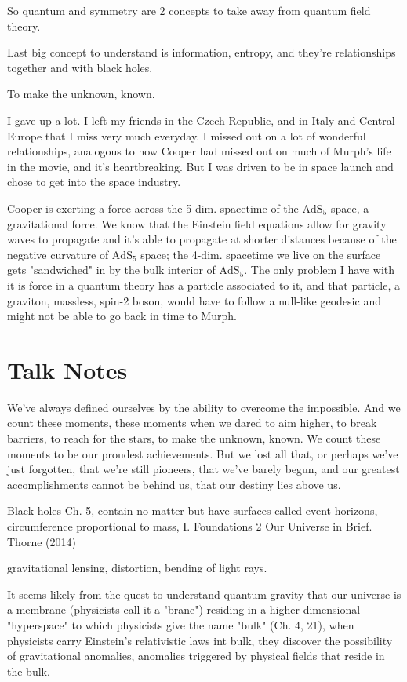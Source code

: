 \documentclass[10pt]{amsart}
\begin{document}
So quantum and symmetry are 2 concepts to take away from quantum field theory.

Last big concept to understand is information, entropy, and they're relationships together and with black holes.



To make the unknown, known.

I gave up a lot. I left my friends in the Czech Republic, and in Italy and Central Europe that I miss very much everyday. I missed out on a lot of wonderful relationships, analogous to how Cooper had missed out on much of Murph's life in the movie, and it's heartbreaking. But I was driven to be in space launch and chose to get into the space industry.

Cooper is exerting a force across the 5-dim. spacetime of the $\text{AdS}_5$ space, a gravitational force. We know that the Einstein field equations allow for gravity waves to propagate and it's able to propagate at shorter distances because of the negative curvature of $\text{AdS}_5$ space; the 4-dim. spacetime we live on the surface gets "sandwiched" in by the bulk interior of $\text{AdS}_5$. The only problem I have with it is force in a quantum theory has a particle associated to it, and that particle, a graviton, massless, spin-2 boson, would have to follow a null-like geodesic and might not be able to go back in time to Murph.


\section{Talk Notes}

We've always defined ourselves by the ability to overcome the impossible. And we count these moments, these moments when we dared to aim higher, to break barriers, to reach for the stars, to make the unknown, known. We count these moments to be our proudest achievements. But we lost all that, or perhaps we've just forgotten, that we're still pioneers, that we've barely begun, and our greatest accomplishments cannot be behind us, that our destiny lies above us. 


Black holes Ch. 5, contain no matter but have surfaces called event horizons, circumference proportional to mass, I. Foundations 2 Our Universe in Brief. Thorne (2014) \cite{Thor2014}

gravitational lensing, distortion, bending of light rays.

It seems likely from the quest to understand quantum gravity that our universe is a membrane (physicists call it a "brane") residing in a higher-dimensional "hyperspace" to which physicists give the name "bulk" (Ch. 4, 21), when physicists carry Einstein's relativistic laws int bulk, they discover the possibility of gravitational anomalies, anomalies triggered by physical fields that reside in the bulk.
\end{document}
